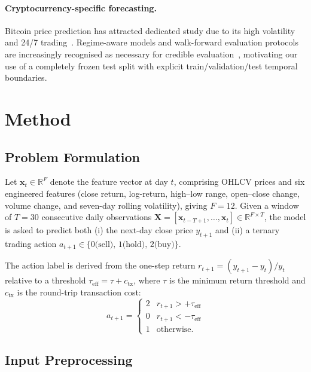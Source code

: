 \documentclass[runningheads]{llncs}
\begin{document}
\paragraph{Cryptocurrency-specific forecasting.}
Bitcoin price prediction has attracted dedicated study due to its high
volatility and 24/7 trading~\cite{ji2019does}.  Regime-aware models and
walk-forward evaluation protocols are increasingly recognised as necessary for
credible evaluation~\cite{atsalakis2019bitcoin}, motivating our use of a
completely frozen test split with explicit train/validation/test temporal
boundaries.

\section{Method}
\label{sec:method}

\subsection{Problem Formulation}
\label{sec:formulation}

Let $\mathbf{x}_t \in \mathbb{R}^F$ denote the feature vector at day $t$,
comprising OHLCV prices and six engineered features (close return, log-return,
high--low range, open--close change, volume change, and seven-day rolling
volatility), giving $F=12$.  Given a window of $T=30$ consecutive daily
observations $\mathbf{X} = [\mathbf{x}_{t-T+1}, \ldots, \mathbf{x}_t]
\in \mathbb{R}^{F \times T}$, the model is asked to predict both (i) the
next-day close price $y_{t+1}$ and (ii) a ternary trading action
$a_{t+1} \in \{0\text{(sell)},\, 1\text{(hold)},\, 2\text{(buy)}\}$.

The action label is derived from the one-step return
$r_{t+1} = (y_{t+1} - y_t) / y_t$ relative to a threshold $\tau_{\text{eff}}
= \tau + c_{\text{tx}}$, where $\tau$ is the minimum return threshold and
$c_{\text{tx}}$ is the round-trip transaction cost:
\begin{equation}
  a_{t+1} =
  \begin{cases}
    2 & r_{t+1} >  +\tau_{\text{eff}} \\
    0 & r_{t+1} <  -\tau_{\text{eff}} \\
    1 & \text{otherwise.}
  \end{cases}
  \label{eq:action_label}
\end{equation}

\subsection{Input Preprocessing}
\label{sec:preprocess}
\end{document}
